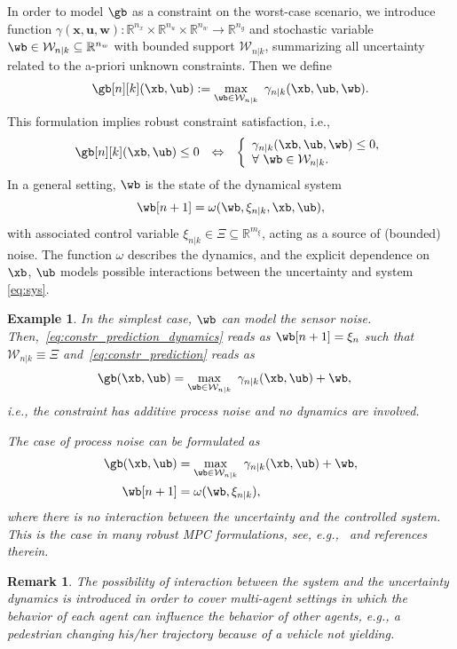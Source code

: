 \documentclass[journal]{IEEEtran}
\newcommand{\x}{{\mathbf{x}}}
\renewcommand{\u}{{\mathbf{u}}}
\newcommand{\w}{{\mathbf{w}}}
\newcommand{\Wb}{\mathcal{{W}}}
\newtheorem{Remark}{Remark}
\newtheorem{Example}{Example}
\begin{document}
	In order to model $\gb$ as a constraint on the worst-case scenario, we introduce function $\gamma(\x,\u,\w):\mathbb{R}^{n_x}\times\mathbb{R}^{n_u}\times\mathbb{R}^{n_w}\rightarrow\mathbb{R}^{n_g}$ and stochastic variable $\wb\in\Wb_{n|k}\subseteq\mathbb{R}^{n_w}$ with bounded support $\Wb_{n|k}$, summarizing all uncertainty related to the a-priori unknown constraints. Then we define
	\begin{equation}
	\label{eq:constr_prediction}
	\gb[n][k](\xb,\ub) := \max_{\wb\in\Wb_{n|k}} \ \gamma_{n|k}(\xb,\ub,\wb).
	\end{equation}
	This formulation implies robust constraint satisfaction, i.e.,
	\begin{align*}
	\gb[n][k](\xb,\ub) \leq 0 && \Leftrightarrow && \left \{\begin{array}{l}
	\gamma_{n|k}(\xb,\ub,\wb) \leq 0, \\ \forall \ \wb\in\Wb_{n|k}.
	\end{array}\right.
	\end{align*}	
	In a general setting, $\wb$ is the state of the dynamical system
	\begin{equation}
	\wb[n+1] = \omega(\wb,\xi_{n|k},\xb,\ub), \label{eq:constr_prediction_dynamics}
	\end{equation}
	with associated control variable $\xi_{n|k}\in\Xi\subseteq\mathbb{R}^{m_\xi}$, acting as a source of (bounded) noise. The function $\omega$ describes the dynamics, and the explicit dependence on $\xb$, $\ub$ models possible interactions between the uncertainty and system \eqref{eq:sys}. 
	\begin{Example}
		\label{ex:noise}
		In the simplest case, $\wb$ can model the sensor noise. Then,~\eqref{eq:constr_prediction_dynamics} reads as $\wb[n+1] = \xi_n$ such that $\Wb_{n|k} \equiv \Xi$ and~\eqref{eq:constr_prediction} reads as 
		\begin{align*}
		\gb(\xb,\ub) &=\max_{\wb\in\Wb_{n|k}} \ \gamma_{n|k}(\xb,\ub) + \wb, 
		\end{align*}
		i.e., the constraint has additive process noise and no dynamics are involved. 
		
		The case of process noise can be formulated as
		\begin{align*}
		\gb(\xb,\ub) &=\max_{\wb\in\Wb_{n|k}} \ \gamma_{n|k}(\xb,\ub) + \wb, \\ 
		\wb[n+1] &= \omega(\wb,\xi_{n|k}),
		\end{align*}
		where there is no interaction between the uncertainty and the controlled system. This is the case in many robust MPC formulations, see, e.g.,~\cite{Mayne2014} and references therein.	
	\end{Example}
	\begin{Remark}
		The possibility of interaction between the system and the uncertainty dynamics is introduced in order to cover multi-agent settings in which the behavior of each agent can influence the behavior of other agents, e.g., a pedestrian changing his/her trajectory because of a vehicle not yielding. 
	\end{Remark}
	
\end{document}

